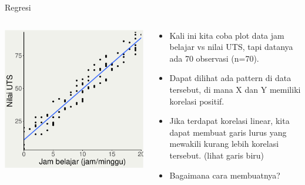 \documentclass[
  ignorenonframetext,
]{beamer}
\begin{document}
\begin{frame}{Regresi}
\label{regresi-1}
\begin{columns}[T]
\begin{column}{0.47\textwidth}
\includegraphics{index_files/figure-beamer/unnamed-chunk-21-1.pdf}
\end{column}

\begin{column}{0.47\textwidth}
\begin{itemize}
\item
  Kali ini kita coba plot data jam belajar vs nilai UTS, tapi datanya
  ada 70 observasi (n=70).
\item
  Dapat dilihat ada pattern di data tersebut, di mana X dan Y memiliki
  korelasi positif.
\item
  Jika terdapat korelasi linear, kita dapat membuat garis lurus yang
  mewakili kurang lebih korelasi tersebut. (lihat garis biru)
\item
  Bagaimana cara membuatnya?
\end{itemize}
\end{column}
\end{columns}
\end{frame}
\end{document}
